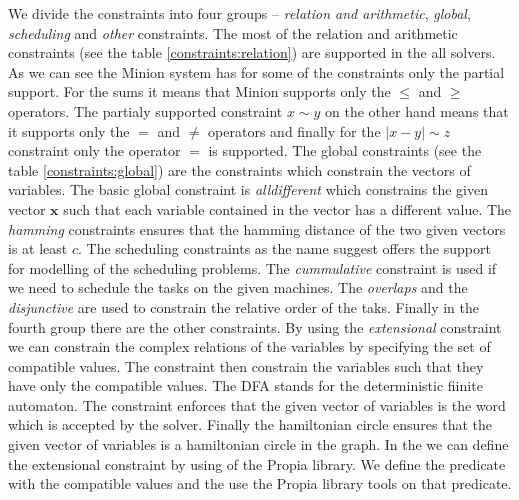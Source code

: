 We divide the constraints into four groups -- {\em relation and arithmetic}, {\em global}, {\em scheduling} and {\em other} constraints.
The most of the relation and arithmetic constraints (see the table \ref{constraints:relation}) are 
supported in the all solvers. As we can see the Minion system has for some of the
constraints only the partial support. For the sums it means that Minion supports
only the $\leq$ and $\geq$ operators. The partialy supported constraint $x \sim y$ on the other hand
means that it supports only the $=$ and $\neq$ operators and finally for the $|x-y| \sim z$ constraint
only the operator $=$ is supported. The global constraints (see the table \ref{constraints:global})
are the constraints which constrain the vectors of variables. The basic global constraint
is {\em alldifferent} which constrains the given vector $\mathbf{x}$ such that each
variable contained in the vector has a different value. The {\em hamming} constraints
ensures that the hamming distance of the two given vectors is at least $c$.
The scheduling constraints as the name suggest offers the support for modelling
of the scheduling problems. The {\em cummulative} constraint is used if we need to
schedule the tasks on the given machines. The {\em overlaps} and the {\em disjunctive}
are used to constrain the relative order of the taks. Finally in the fourth group
there are the other constraints. By using the {\em extensional} constraint we can 
constrain the complex relations of the variables by specifying the set of compatible 
values. The constraint then constrain the variables such that they have only the 
compatible values. The {DFA} stands for the deterministic fiinite automaton. The
constraint enforces that the given vector of variables is the word which is accepted
by the solver. Finally the {hamiltonian circle} ensures that the given vector of variables 
is a hamiltonian circle in the graph. In the \eclipse we can define the extensional 
constraint by using of the Propia library. We define the predicate with the compatible
values and the use the Propia library tools on that predicate.  



